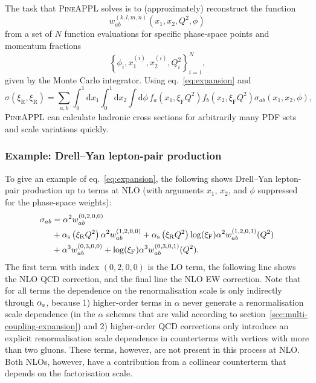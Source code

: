 The task that \textsc{PineAPPL} solves is to (approximately) reconstruct the function
\begin{equation}
w_{ab}^{(k,l,m,n)} \left( x_1, x_2, Q^2, \phi \right)
\end{equation}
from a set of $N$ function evaluations for specific phase-space points and momentum fractions
\begin{equation}
\left\{ \phi_i, x_1^{(i)}, x_2^{(i)}, Q^2_i \right\}_{i=1}^N \text{,}
\end{equation}
given by the Monte Carlo integrator.
Using eq.~\eqref{eq:expansion} and
\begin{equation}
\sigma (\xi_\mathrm{R}, \xi_\mathrm{R}) = \sum_{a,b} \int_0^1 \mathrm{d} x_1 \int_0^1 \mathrm{d} x_2 \int \mathrm{d} \phi \, f_a (x_1, \xi_\mathrm{F} Q^2) f_b (x_2, \xi_\mathrm{F} Q^2) \sigma_{ab} (x_1, x_2, \phi) \text{,}
\label{eq:pineappl-convolution}
\end{equation}
\textsc{PineAPPL} can calculate hadronic cross sections for arbitrarily many PDF sets and scale variations quickly.

\subsubsection{Example: Drell--Yan lepton-pair production}
\label{sec:pineappl-example}

To give an example of eq.~\eqref{eq:expansion}, the following shows Drell--Yan lepton-pair production up to terms at NLO (with arguments $x_1$, $x_2$, and $\phi$ suppressed for the phase-space weights):
\begin{equation}
\begin{split}
\sigma_{ab}
    &= \alpha^2 w_{ab}^{(0,2,0,0)} \\
    &+ \alpha_\mathrm{s} \left( \xi_\mathrm{R} Q^2 \right) \alpha^2 w_{ab}^{(1,2,0,0)} + \alpha_\mathrm{s} \left( \xi_\mathrm{R} Q^2 \right) \log (\xi_\mathrm{F}) \alpha^2 w_{ab}^{(1,2,0,1)} (Q^2) \\
    &+ \alpha^3 w_{ab}^{(0,3,0,0)} + \log (\xi_\mathrm{F}) \alpha^3 w_{ab}^{(0,3,0,1)} (Q^2) \text{.}
\end{split}
\end{equation}
The first term with index $(0,2,0,0)$ is the LO term, the following line shows the NLO QCD correction, and the final line the NLO EW correction.
Note that for all terms the dependence on the renormalisation scale is only indirectly through $\alpha_\mathrm{s}$, because 1) higher-order terms in $\alpha$ never generate a renormalisation scale dependence (in the $\alpha$ schemes that are valid according to section~\ref{sec:multi-coupling-expansion}) and 2) higher-order QCD corrections only introduce an explicit renormalisation scale dependence in counterterms with vertices with more than two gluons.
These terms, however, are not present in this process at NLO\@.
Both NLOs, however, have a contribution from a collinear counterterm that depends on the factorisation scale.

